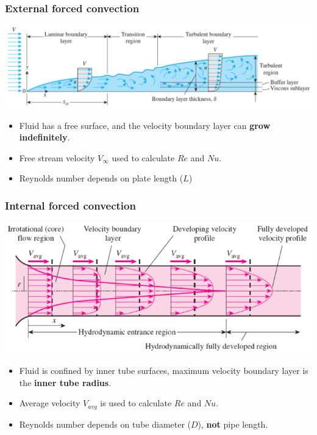 \documentclass[11pt]{article}
\begin{document}
\subsubsection{External forced convection}
\label{sec:org7cde238}
\begin{center}
\includegraphics[width=.9\linewidth]{./images/reynolds-number-diagram.png}
\end{center}
\begin{itemize}
\item Fluid has a free surface, and the velocity boundary layer can \textbf{grow indefinitely}.
\item Free stream velocity \(V_{\infty}\) used to calculate \(Re\) and \(Nu\).
\item Reynolds number depends on plate length (\(L\))
\end{itemize}

\subsubsection{Internal forced convection}
\label{sec:org57b4112}
\begin{center}
\includegraphics[width=.9\linewidth]{./images/circular-pipe-flow.png}
\end{center}
\begin{itemize}
\item Fluid is confined by inner tube surfaces, maximum velocity boundary layer is the \textbf{inner tube radius}.
\item Average velocity \(V_{avg}\) is used to calculate \(Re\) and \(Nu\).
\item Reynolds number depends on tube diameter (\(D\)), \textbf{not} pipe length.
\end{itemize}
\end{document}
